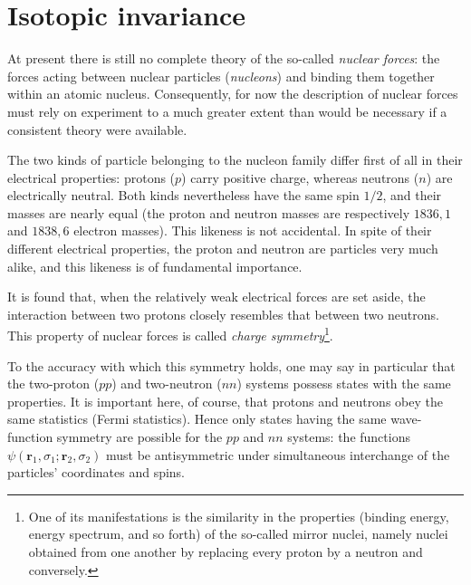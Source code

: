 \section{Isotopic invariance}

At present there is still no complete theory of the so-called \emph{nuclear
forces}: the forces acting between nuclear particles (\emph{nucleons}) and
binding them together within an atomic nucleus. Consequently, for now the
description of nuclear forces must rely on experiment to a much greater extent
than would be necessary if a consistent theory were available.

The two kinds of particle belonging to the nucleon family differ first of all
in their electrical properties: protons ($p$) carry positive charge, whereas
neutrons ($n$) are electrically neutral. Both kinds nevertheless have the same
spin $1/2$, and their masses are nearly equal (the proton and neutron masses
are respectively $1836{,}1$ and $1838{,}6$ electron masses). This likeness is
not accidental. In spite of their different electrical properties, the proton
and neutron are particles very much alike, and this likeness is of fundamental
importance.

It is found that, when the relatively weak electrical forces are set aside,
the interaction between two protons closely resembles that between two
neutrons. This property of nuclear forces is called \emph{charge
symmetry}\footnote{One of its manifestations is the similarity in the
properties (binding energy, energy spectrum, and so forth) of the so-called
mirror nuclei, namely nuclei obtained from one another by replacing every
proton by a neutron and conversely.}.

To the accuracy with which this symmetry holds, one may say in particular that
the two-proton ($pp$) and two-neutron ($nn$) systems possess states with the
same properties. It is important here, of course, that protons and neutrons
obey the same statistics (Fermi statistics). Hence only states having the same
wave-function symmetry are possible for the $pp$ and $nn$ systems: the
functions $\psi(\mathbf r_1,\sigma_1;\mathbf r_2,\sigma_2)$ must be
antisymmetric under simultaneous interchange of the particles' coordinates
and spins.

